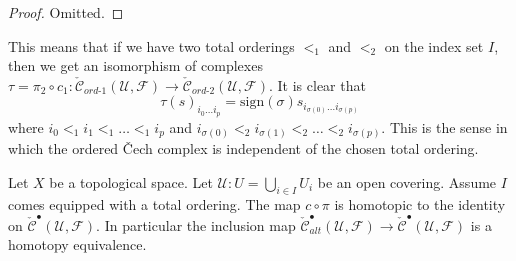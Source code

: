 \begin{proof}
Omitted.
\end{proof}

\begin{remark}
\label{remark-compared-ordered-complexes}
This means that if we have two total orderings $<_1$ and $<_2$ on
the index set $I$, then we get an isomorphism of complexes
$\tau = \pi_2 \circ c_1 :
\check{\mathcal{C}}_{ord\text{-}1}(\mathcal{U}, \mathcal{F}) \to
\check{\mathcal{C}}_{ord\text{-}2}(\mathcal{U}, \mathcal{F})$.
It is clear that
$$
\tau(s)_{i_0 \ldots i_p} =
\text{sign}(\sigma) s_{i_{\sigma(0)} \ldots i_{\sigma(p)}}
$$
where $i_0 <_1 i_1 <_1 \ldots <_1 i_p$ and
$i_{\sigma(0)} <_2 i_{\sigma(1)} <_2 \ldots <_2 i_{\sigma(p)}$.
This is the sense in which the ordered {\v C}ech complex is independent
of the chosen total ordering.
\end{remark}

\begin{lemma}
\label{lemma-alternating-usual}
Let $X$ be a topological space.
Let $\mathcal{U} : U = \bigcup_{i \in I} U_i$ be an open covering.
Assume $I$ comes equipped with a total ordering.
The map $c \circ \pi$ is homotopic to the identity on
$\check{\mathcal{C}}^\bullet(\mathcal{U}, \mathcal{F})$.
In particular the inclusion map
$\check{\mathcal{C}}_{alt}^\bullet(\mathcal{U}, \mathcal{F}) \to
\check{\mathcal{C}}^\bullet(\mathcal{U}, \mathcal{F})$
is a homotopy equivalence.
\end{lemma}

